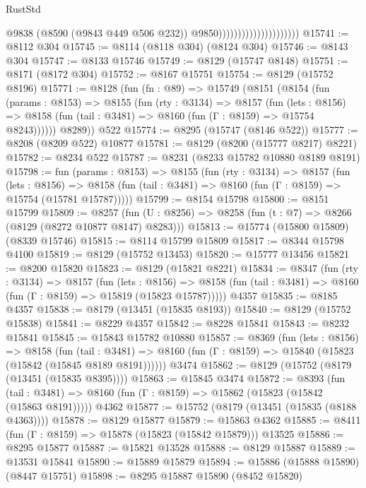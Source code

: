 \begin{lexlean}{RustStd}
\begin{coremodule}
                                              @9838
                                              (@8590 (@9843 @449 @506 @232))
                                              @9850)))))))))))))))))))))
@15741 := @8112 @304
@15745 := @8114 (@8118 @304) (@8124 @304)
@15746 := @8143 @304
@15747 := @8133 @15746
@15749 := @8129 (@15747 @8148)
@15751 := @8171 (@8172 @304)
@15752 := @8167 @15751
@15754 := @8129 (@15752 @8196)
@15771 := @8128
    (fun (fn : @89) =>
    @15749
      (@8151
        (@8154
          (fun (params : @8153) =>
          @8155
            (fun (rty : @3134) =>
            @8157
              (fun (lets : @8156) =>
              @8158 (fun (tail : @3481) => @8160 (fun (Γ : @8159) => @15754 @8243))))))
        @8289))
    @522
@15774 := @8295 (@15747 (@8146 @522))
@15777 := @8208 (@8209 @522) @10877
@15781 := @8129 (@8200 (@15777 @8217) @8221)
@15782 := @8234 @522
@15787 := @8231 (@8233 @15782 @10880 @8189 @8191)
@15798 := fun (params : @8153) =>
  @8155
    (fun (rty : @3134) =>
    @8157
      (fun (lets : @8156) =>
      @8158 (fun (tail : @3481) => @8160 (fun (Γ : @8159) => @15754 (@15781 @15787)))))
@15799 := @8154 @15798
@15800 := @8151 @15799
@15809 := @8257
    (fun (U : @8256) => @8258 (fun (t : @7) => @8266 (@8129 (@8272 @10877 @8147) @8283)))
@15813 := @15774 (@15800 @15809) (@8339 @15746)
@15815 := @8114 @15799 @15809
@15817 := @8344 @15798 @4100
@15819 := @8129 (@15752 @13453)
@15820 := @15777 @13456
@15821 := @8200 @15820
@15823 := @8129 (@15821 @8221)
@15834 := @8347
    (fun (rty : @3134) =>
    @8157
      (fun (lets : @8156) =>
      @8158 (fun (tail : @3481) => @8160 (fun (Γ : @8159) => @15819 (@15823 @15787)))))
    @4357
@15835 := @8185 @4357
@15838 := @8179 (@13451 (@15835 @8193))
@15840 := @8129 (@15752 @15838)
@15841 := @8229 @4357
@15842 := @8228 @15841
@15843 := @8232 @15841
@15845 := @15843 @15782 @10880
@15857 := @8369
    (fun (lets : @8156) =>
    @8158
      (fun (tail : @3481) =>
      @8160 (fun (Γ : @8159) => @15840 (@15823 (@15842 (@15845 @8189 @8191))))))
    @3474
@15862 := @8129 (@15752 (@8179 (@13451 (@15835 @8395))))
@15863 := @15845 @3474
@15872 := @8393
    (fun (tail : @3481) => @8160 (fun (Γ : @8159) => @15862 (@15823 (@15842 (@15863 @8191)))))
    @4362
@15877 := @15752 (@8179 (@13451 (@15835 (@8188 @4363))))
@15878 := @8129 @15877
@15879 := @15863 @4362
@15885 := @8411 (fun (Γ : @8159) => @15878 (@15823 (@15842 @15879))) @13525
@15886 := @8295 @15877
@15887 := @15821 @13528
@15888 := @8129 @15887
@15889 := @13531 @15841
@15890 := @15889 @15879
@15894 := @15886 (@15888 @15890) (@8447 @15751)
@15898 := @8295 @15887 @15890 (@8452 @15820)

\end{coremodule}
\end{lexlean}
